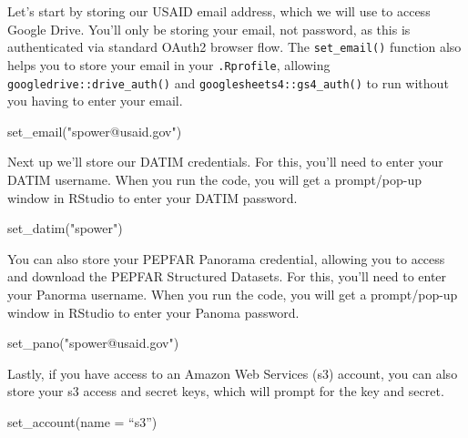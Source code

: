 \documentclass[
  letterpaper,
  DIV=11,
  numbers=noendperiod]{scrreprt}
\newenvironment{Shaded}{\begin{snugshade}}{\end{snugshade}}
\newcommand{\AttributeTok}[1]{\textcolor[rgb]{0.40,0.45,0.13}{#1}}
\newcommand{\FunctionTok}[1]{\textcolor[rgb]{0.28,0.35,0.67}{#1}}
\newcommand{\NormalTok}[1]{\textcolor[rgb]{0.00,0.23,0.31}{#1}}
\newcommand{\StringTok}[1]{\textcolor[rgb]{0.13,0.47,0.30}{#1}}
\begin{document}
Let's start by storing our USAID email address, which we will use to
access Google Drive. You'll only be storing your email, not password, as
this is authenticated via standard OAuth2 browser flow. The
\texttt{set\_email()} function also helps you to store your email in
your \texttt{.Rprofile}, allowing \texttt{googledrive::drive\_auth()}
and \texttt{googlesheets4::gs4\_auth()} to run without you having to
enter your email.

\begin{Shaded}
\begin{Highlighting}[]
\FunctionTok{set\_email}\NormalTok{(}\StringTok{"spower@usaid.gov"}\NormalTok{)}
\end{Highlighting}
\end{Shaded}

Next up we'll store our DATIM credentials. For this, you'll need to
enter your DATIM username. When you run the code, you will get a
prompt/pop-up window in RStudio to enter your DATIM password.

\begin{Shaded}
\begin{Highlighting}[]
\FunctionTok{set\_datim}\NormalTok{(}\StringTok{"spower"}\NormalTok{)}
\end{Highlighting}
\end{Shaded}

You can also store your PEPFAR Panorama credential, allowing you to
access and download the PEPFAR Structured Datasets. For this, you'll
need to enter your Panorma username. When you run the code, you will get
a prompt/pop-up window in RStudio to enter your Panoma password.

\begin{Shaded}
\begin{Highlighting}[]
\FunctionTok{set\_pano}\NormalTok{(}\StringTok{"spower@usaid.gov"}\NormalTok{)}
\end{Highlighting}
\end{Shaded}

Lastly, if you have access to an Amazon Web Services (s3) account, you
can also store your s3 access and secret keys, which will prompt for the
key and secret.

\begin{Shaded}
\begin{Highlighting}[]
\FunctionTok{set\_account}\NormalTok{(}\AttributeTok{name =}\NormalTok{ “s3”)}
\end{Highlighting}
\end{Shaded}
\end{document}
